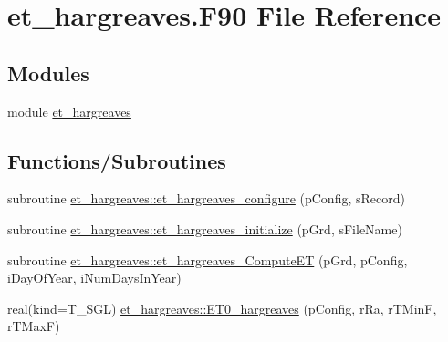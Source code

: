 \hypertarget{et__hargreaves_8_f90}{
\section{et\_\-hargreaves.F90 File Reference}
\label{et__hargreaves_8_f90}
}
\subsection*{Modules}
\begin{DoxyCompactItemize}
\item 
module \hyperlink{namespaceet__hargreaves}{et\_\-hargreaves}
\end{DoxyCompactItemize}
\subsection*{Functions/Subroutines}
\begin{DoxyCompactItemize}
\item 
subroutine \hyperlink{namespaceet__hargreaves_aa81bd6c44c0d862bda8f0a508e6aea47}{et\_\-hargreaves::et\_\-hargreaves\_\-configure} (pConfig, sRecord)
\item 
subroutine \hyperlink{namespaceet__hargreaves_a8b623d04dfb66cab6c0bc1b8ba471c89}{et\_\-hargreaves::et\_\-hargreaves\_\-initialize} (pGrd, sFileName)
\item 
subroutine \hyperlink{namespaceet__hargreaves_a93c5bea9de3b762cce69fe978f75d609}{et\_\-hargreaves::et\_\-hargreaves\_\-ComputeET} (pGrd, pConfig, iDayOfYear, iNumDaysInYear)
\item 
real(kind=T\_\-SGL) \hyperlink{namespaceet__hargreaves_a905bbe6d732ac8cd4ed35b59d1b1177e}{et\_\-hargreaves::ET0\_\-hargreaves} (pConfig, rRa, rTMinF, rTMaxF)
\end{DoxyCompactItemize}

